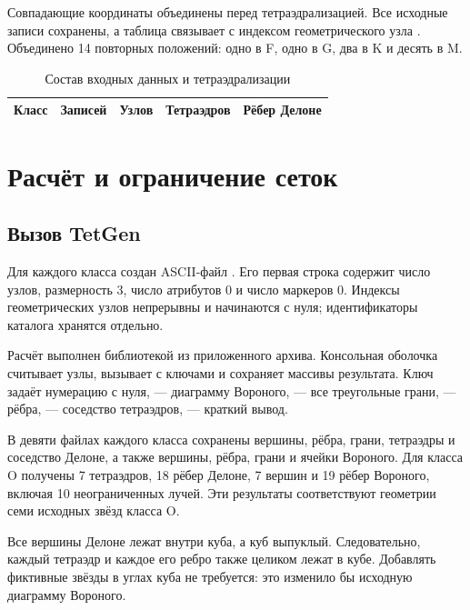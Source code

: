 Совпадающие координаты объединены перед тетраэдрализацией. Все исходные записи сохранены, а таблица  связывает  с индексом геометрического узла . Объединено 14 повторных положений: одно в F, одно в G, два в K и десять в M.

\begin{table}[ht]
\centering\small
\caption{Состав входных данных и тетраэдрализации}
\begin{tabular}{c|r|r|r|r}
Класс & Записей & Узлов & Тетраэдров & Рёбер Делоне\\\hline

\end{tabular}
\end{table}

\section{Расчёт и ограничение сеток}
\subsection{Вызов TetGen}
Для каждого класса создан ASCII-файл . Его первая строка содержит число узлов, размерность 3, число атрибутов 0 и число маркеров 0. Индексы геометрических узлов непрерывны и начинаются с нуля; идентификаторы каталога хранятся отдельно.

Расчёт выполнен библиотекой  из приложенного архива. Консольная оболочка  считывает узлы, вызывает  с ключами  и сохраняет массивы результата. Ключ  задаёт нумерацию с нуля,  --- диаграмму Вороного,  --- все треугольные грани,  --- рёбра,  --- соседство тетраэдров,  --- краткий вывод.

В девяти файлах каждого класса сохранены вершины, рёбра, грани, тетраэдры и соседство Делоне, а также вершины, рёбра, грани и ячейки Вороного. Для класса O получены 7 тетраэдров, 18 рёбер Делоне, 7 вершин и 19 рёбер Вороного, включая 10 неограниченных лучей. Эти результаты соответствуют геометрии семи исходных звёзд класса O.

Все вершины Делоне лежат внутри куба, а куб выпуклый. Следовательно, каждый тетраэдр и каждое его ребро также целиком лежат в кубе. Добавлять фиктивные звёзды в углах куба не требуется: это изменило бы исходную диаграмму Вороного.


